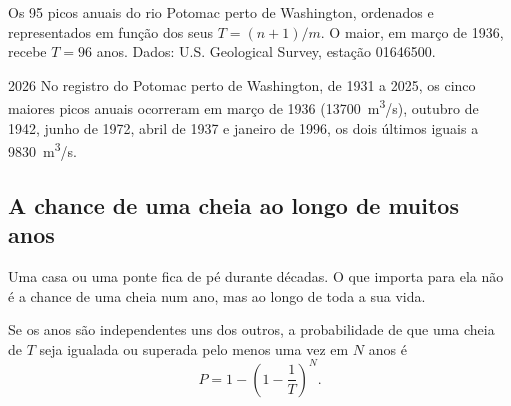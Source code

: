 \begin{omfigure}

{\small Os \num{95} picos anuais do rio Potomac perto de Washington,
ordenados e representados em função dos seus 
$T = (n+1)/m$. O maior, em março de 1936, recebe $T = 96$ anos. Dados: U.S.
Geological Survey, estação 01646500.}
\end{omfigure}

\begin{dated}{2026}
No registro do Potomac perto de Washington, de 1931 a 2025, os cinco maiores
picos anuais ocorreram em março de 1936 (\qty{13700}{m^3/s}), outubro de
1942, junho de 1972, abril de 1937 e janeiro de 1996, os dois últimos iguais
a \qty{9830}{m^3/s}.
\end{dated}

\subsection*{A chance de uma cheia ao longo de muitos anos}

Uma casa ou uma ponte fica de pé durante décadas. O que importa para ela não
é a chance de uma cheia num ano, mas ao longo de toda a sua vida.

\begin{proposition}\label{prop:g10:drainage-basins:chance}
Se os anos são independentes uns dos outros, a probabilidade de que uma
cheia de  $T$ seja igualada ou superada pelo menos uma vez
em $N$ anos é
\[
P = 1 - \left(1 - \frac{1}{T}\right)^{N}.
\]
\end{proposition}

